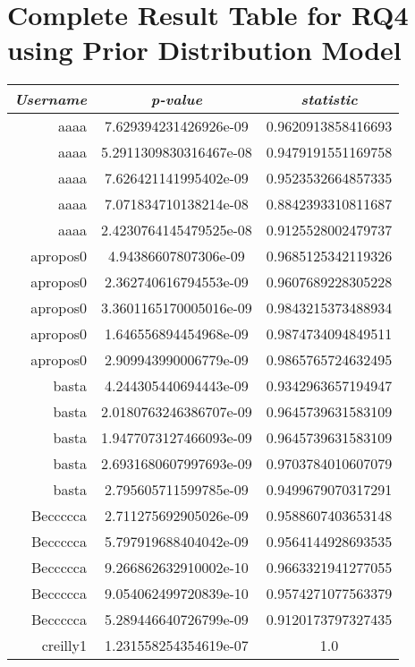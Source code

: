 \chapter{Complete Result Table for RQ4 using Prior Distribution Model}
\label{appendix_rq4_complete_prior_distribution_results_table}

\begin{tabular}{@{}r c c@{}}
    \toprule
    \emph{Username} & \emph{p-value} & \emph{\tau{} statistic} \\\midrule
    aaaa & 7.629394231426926e-09 & 0.9620913858416693 \\
    aaaa & 5.2911309830316467e-08 & 0.9479191551169758 \\
    aaaa & 7.626421141995402e-09 & 0.9523532664857335 \\
    aaaa & 7.071834710138214e-08 & 0.8842393310811687 \\
    aaaa & 2.4230764145479525e-08 & 0.9125528002479737 \\
    apropos0 & 4.94386607807306e-09 & 0.9685125342119326 \\
    apropos0 & 2.362740616794553e-09 & 0.9607689228305228 \\
    apropos0 & 3.3601165170005016e-09 & 0.9843215373488934 \\
    apropos0 & 1.646556894454968e-09 & 0.9874734094849511 \\
    apropos0 & 2.909943990006779e-09 & 0.9865765724632495 \\
    basta & 4.244305440694443e-09 & 0.9342963657194947 \\
    basta & 2.0180763246386707e-09 & 0.9645739631583109 \\
    basta & 1.9477073127466093e-09 & 0.9645739631583109 \\
    basta & 2.6931680607997693e-09 & 0.9703784010607079 \\
    basta & 2.795605711599785e-09 & 0.9499679070317291 \\
    Beccccca & 2.711275692905026e-09 & 0.9588607403653148 \\
    Beccccca & 5.797919688404042e-09 & 0.9564144928693535 \\
    Beccccca & 9.266862632910002e-10 & 0.9663321941277055 \\
    Beccccca & 9.054062499720839e-10 & 0.9574271077563379 \\
    Beccccca & 5.289446640726799e-09 & 0.9120173797327435 \\
    creilly1 & 1.231558254354619e-07 & 1.0 \\

\end{tabular}
